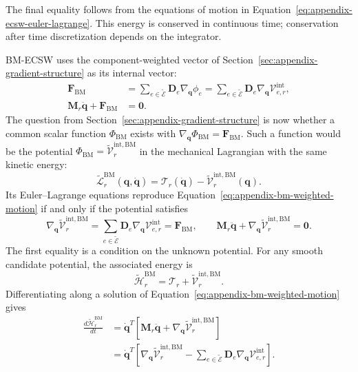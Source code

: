 \documentclass[a4paper,12pt]{article}
\newcommand{\vect}[1]{\boldsymbol{#1}}
\newcommand{\matr}[1]{\boldsymbol{#1}}
\begin{document}
The final equality follows from the equations of motion in Equation~\eqref{eq:appendix-ecsw-euler-lagrange}. This energy is conserved in continuous time; conservation after time discretization depends on the integrator.

BM-ECSW uses the component-weighted vector of Section~\ref{sec:appendix-gradient-structure} as its internal vector:
\begin{equation}
 \begin{aligned}
 \vect{F}_{\mathrm{BM}}
 &=\sum_{e\in\widetilde{\mathcal E}}\matr{D}_e\nabla_{\vect{q}}\phi_e
  =\sum_{e\in\widetilde{\mathcal E}}\matr{D}_e\nabla_{\vect{q}}\mathcal V_{e,r}^{\mathrm{int}},\\
 \matr{M}_r\ddot{\vect{q}}+\vect{F}_{\mathrm{BM}}
 &=\vect{0}.
 \end{aligned}
 \label{eq:appendix-bm-weighted-motion}
\end{equation}
The question from Section~\ref{sec:appendix-gradient-structure} is now whether a common scalar function $\Phi_{\mathrm{BM}}$ exists with $\nabla_{\vect{q}}\Phi_{\mathrm{BM}}=\vect{F}_{\mathrm{BM}}$. Such a function would be the potential $\Phi_{\mathrm{BM}}=\widetilde{\mathcal V}_r^{\mathrm{int},\mathrm{BM}}$ in the mechanical Lagrangian with the same kinetic energy:
\begin{equation}
 \widetilde{\mathcal L}_r^{\mathrm{BM}}(\vect{q},\dot{\vect{q}})
 =\mathcal T_r(\dot{\vect{q}})
  -\widetilde{\mathcal V}_r^{\mathrm{int},\mathrm{BM}}(\vect{q}).
 \label{eq:appendix-bm-candidate-lagrangian}
\end{equation}
Its Euler--Lagrange equations reproduce Equation~\eqref{eq:appendix-bm-weighted-motion} if and only if the potential satisfies
\begin{equation}
 \nabla_{\vect{q}}\widetilde{\mathcal V}_r^{\mathrm{int},\mathrm{BM}}
 =\sum_{e\in\widetilde{\mathcal E}}
       \matr{D}_e\nabla_{\vect{q}}\mathcal V_{e,r}^{\mathrm{int}}
 =\vect{F}_{\mathrm{BM}},
 \qquad
 \matr{M}_r\ddot{\vect{q}}
 +\nabla_{\vect{q}}\widetilde{\mathcal V}_r^{\mathrm{int},\mathrm{BM}}
 =\vect{0}.
 \label{eq:appendix-bm-structural-motion}
\end{equation}
The first equality is a condition on the unknown potential. For any smooth candidate potential, the associated energy is
\[
 \widetilde{\mathcal H}_r^{\mathrm{BM}}
 =\mathcal T_r+\widetilde{\mathcal V}_r^{\mathrm{int},\mathrm{BM}}.
\]
Differentiating along a solution of Equation~\eqref{eq:appendix-bm-weighted-motion} gives
\begin{equation}
 \begin{aligned}
 \frac{d\widetilde{\mathcal H}_r^{\mathrm{BM}}}{dt}
 &=\dot{\vect{q}}^T
   \left[\matr{M}_r\ddot{\vect{q}}
         +\nabla_{\vect{q}}\widetilde{\mathcal V}_r^{\mathrm{int},\mathrm{BM}}\right]\\
 &=\dot{\vect{q}}^T
   \left[\nabla_{\vect{q}}\widetilde{\mathcal V}_r^{\mathrm{int},\mathrm{BM}}
         -\sum_{e\in\widetilde{\mathcal E}}
             \matr{D}_e\nabla_{\vect{q}}\mathcal V_{e,r}^{\mathrm{int}}\right].
 \end{aligned}
 \label{eq:appendix-bm-mechanical-energy-derivative}
\end{equation}
\end{document}
